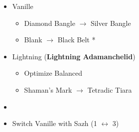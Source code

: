 \begin{menu}
\begin{itemize}
\begin{itemize}
\begin{itemize}
			      \end{itemize}
			\item Vanille
			      \begin{itemize}
				      \item Diamond Bangle $\rightarrow$ Silver Bangle
				      \item Blank $\rightarrow$ Black Belt *
			      \end{itemize}
			\item Lightning ({\bf Lightning Adamanchelid})
			      \begin{itemize}
				      \item Optimize Balanced
				      \item Shaman's Mark $\rightarrow$ Tetradic Tiara
			      \end{itemize}
		\end{itemize}
		\paradigm
		\begin{itemize}
			\item {}%
			      {\paradigmline{(\com)}{(\com)}{\com}}%
			      {\paradigmline[2]{\textit{(\com)}}{\textit{(\com)}}{\textit{\com}}}%
			      {\paradigmline{(\sab)}{\sen}{\syn}}%
			      {\paradigmline{\med}{\rav}{[\syn]}}%
			      {\paradigmline{\med}{\rav}{[\rav]}}%
			      {\paradigmline{[\rav]}{\rav}{\rav}}
			\item Switch Vanille with Sazh (1 $\leftrightarrow$ 3)
		\end{itemize}
	\end{itemize}
\end{menu}

\renewcommand{\first}{[1] Cerberus (\com/\com/\com)}
\renewcommand{\second}{[2] Cerberus (\com/\com/\com)}
\renewcommand{\third}{[3] Premeditation (\syn/\sen/\sab)}
\renewcommand{\fourth}{[4] Coordination (\syn/\rav/\med)}
\renewcommand{\fifth}{[5] Thaumaturgy (\rav/\rav/\med)}
\renewcommand{\sixth}{[6] Tri-Disaster (\rav/\rav/\rav)}

